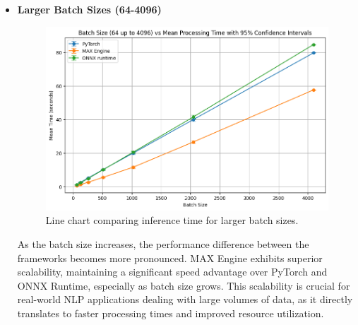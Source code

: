 \documentclass[conference]{IEEEtran}
\begin{document}
\begin{itemize}
    \item \textbf{Larger Batch Sizes (64-4096)}
    \begin{figure}[H]
        \centerline{\includegraphics[width=\linewidth]{4.png}}
        \caption{ Line chart comparing inference time for larger batch sizes.}
        \label{fig4}
    \end{figure}
    As the batch size increases, the performance difference between the frameworks becomes more pronounced. MAX Engine exhibits superior scalability, maintaining a significant speed advantage over PyTorch and ONNX Runtime, especially as batch size grows. This scalability is crucial for real-world NLP applications dealing with large volumes of data, as it directly translates to faster processing times and improved resource utilization.
\end{itemize}
\end{document}
